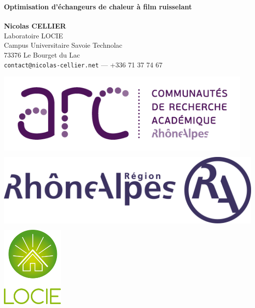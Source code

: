 \documentclass[a0,portrait]{a0poster}
\begin{document}


\begin{minipage}[b]{0.5\linewidth}
\veryHuge \color{NavyBlue} \textbf{Optimisation d'échangeurs de chaleur à film ruisselant} \color{Black}\\ %
\Huge\textit{}\\[2cm] %
\huge \textbf{Nicolas CELLIER}\\[0.5cm] %
\huge Laboratoire LOCIE\\
Campus Universitaire Savoie Technolac\\
73376 Le Bourget du Lac\\[0.4cm] %
\Large \texttt{contact@nicolas-cellier.net} --- +336 71 37 74 67\\
\end{minipage}
%
\begin{minipage}[b]{0.5\linewidth}
\begin{flushright}
	\includegraphics[height=4cm]{logo-arc-72dpi}
  \hspace{1cm}
  \includegraphics[height=4cm]{logo_ra}
	\hspace{1cm}
	\includegraphics[height=4cm]{locie-logo}
\end{flushright}
\vspace{10cm}
\end{minipage}
\end{document}
